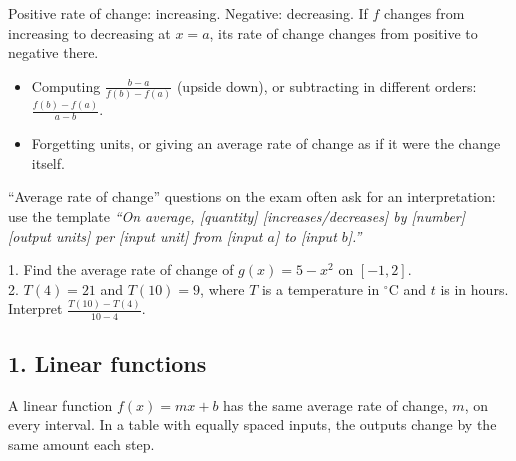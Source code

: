 \begin{keyidea}
Positive rate of change: increasing. Negative: decreasing. If $f$ changes from increasing to decreasing at $x=a$, its rate of change changes from positive to negative there.
\end{keyidea}

\begin{mistakes}
\begin{itemize}
\item Computing $\frac{b-a}{f(b)-f(a)}$ (upside down), or subtracting in different orders: $\frac{f(b)-f(a)}{a-b}$.
\item Forgetting units, or giving an average rate of change as if it were the change itself.
\end{itemize}
\end{mistakes}

\begin{aptip}
``Average rate of change'' questions on the exam often ask for an interpretation: use the template \emph{``On average, [quantity] [increases/decreases] by [number] [output units] per [input unit] from [input $a$] to [input $b$].''}
\end{aptip}

\begin{quickcheck}
1. Find the average rate of change of $g(x)=5-x^2$ on $[-1,2]$.\\
2. $T(4)=21$ and $T(10)=9$, where $T$ is a temperature in $^\circ$C and $t$ is in hours. Interpret $\frac{T(10)-T(4)}{10-4}$.
\end{quickcheck}


\subsection*{1. Linear functions}
A linear function $f(x)=mx+b$ has the same average rate of change, $m$, on every interval. In a table with equally spaced inputs, the outputs change by the same amount each step.

